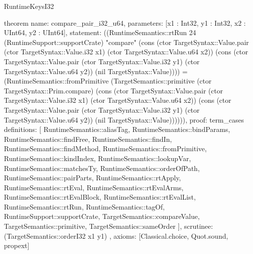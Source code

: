 \begin{lexlean}{RuntimeKeysI32}
\begin{semanticmodule}
theorem{
  name: compare_pair_i32_u64,
  parameters: [x1 : Int32, y1 : Int32, x2 : UInt64, y2 : UInt64],
  statement: ((RuntimeSemantics::rtRun 24 (RuntimeSupport::supportCrate) "compare" (cons (ctor TargetSyntax::Value.pair (ctor TargetSyntax::Value.i32 x1) (ctor TargetSyntax::Value.u64 x2)) (cons (ctor TargetSyntax::Value.pair (ctor TargetSyntax::Value.i32 y1) (ctor TargetSyntax::Value.u64 y2)) (nil TargetSyntax::Value)))) = (RuntimeSemantics::fromPrimitive (TargetSemantics::primitive (ctor TargetSyntax::Prim.compare) (cons (ctor TargetSyntax::Value.pair (ctor TargetSyntax::Value.i32 x1) (ctor TargetSyntax::Value.u64 x2)) (cons (ctor TargetSyntax::Value.pair (ctor TargetSyntax::Value.i32 y1) (ctor TargetSyntax::Value.u64 y2)) (nil TargetSyntax::Value)))))),
  proof: term_cases{
    definitions: [
      RuntimeSemantics::aliasTag,
      RuntimeSemantics::bindParams,
      RuntimeSemantics::findFree,
      RuntimeSemantics::findIn,
      RuntimeSemantics::findMethod,
      RuntimeSemantics::fromPrimitive,
      RuntimeSemantics::kindIndex,
      RuntimeSemantics::lookupVar,
      RuntimeSemantics::matchesTy,
      RuntimeSemantics::orderOfPath,
      RuntimeSemantics::pairParts,
      RuntimeSemantics::rtApply,
      RuntimeSemantics::rtEval,
      RuntimeSemantics::rtEvalArms,
      RuntimeSemantics::rtEvalBlock,
      RuntimeSemantics::rtEvalList,
      RuntimeSemantics::rtRun,
      RuntimeSemantics::tagOf,
      RuntimeSupport::supportCrate,
      TargetSemantics::compareValue,
      TargetSemantics::primitive,
      TargetSemantics::sameOrder
    ],
    scrutinee: (TargetSemantics::orderI32 x1 y1)
  },
  axioms: [Classical.choice, Quot.sound, propext]
}


\end{semanticmodule}
\end{lexlean}
